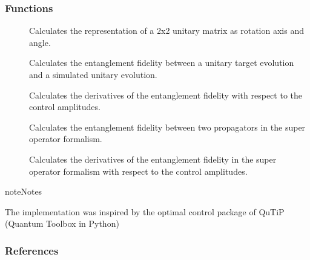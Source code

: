 \documentclass[letterpaper,10pt,english]{sphinxmanual}
\begin{document}
\subsubsection{Functions}
\label{\detokenize{qsim:functions}}\begin{description}
\item[{{\hyperref[\detokenize{qsim:qsim.cost_functions.angle_axis_representation}]{}}}] \leavevmode
Calculates the representation of a 2x2 unitary matrix as rotation axis and
angle.

\item[{{\hyperref[\detokenize{qsim:qsim.cost_functions.entanglement_fidelity}]{}}}] \leavevmode
Calculates the entanglement fidelity between a unitary target evolution and
a simulated unitary evolution.

\item[{{\hyperref[\detokenize{qsim:qsim.cost_functions.deriv_entanglement_fid_sup_op_with_du}]{}}}] \leavevmode
Calculates the derivatives of the entanglement fidelity with respect to
the control amplitudes.

\item[{{\hyperref[\detokenize{qsim:qsim.cost_functions.entanglement_fidelity_super_operator}]{}}}] \leavevmode
Calculates the entanglement fidelity between two propagators in the super
operator formalism.

\item[{{\hyperref[\detokenize{qsim:qsim.cost_functions.derivative_entanglement_fidelity_with_du}]{}}}] \leavevmode
Calculates the derivatives of the entanglement fidelity in the super
operator formalism with respect to the control amplitudes.

\end{description}

\begin{sphinxadmonition}{note}{Notes}

The implementation was inspired by the optimal control package of QuTiP 
(Quantum Toolbox in Python)
\end{sphinxadmonition}
\subsubsection*{References}
\end{document}
